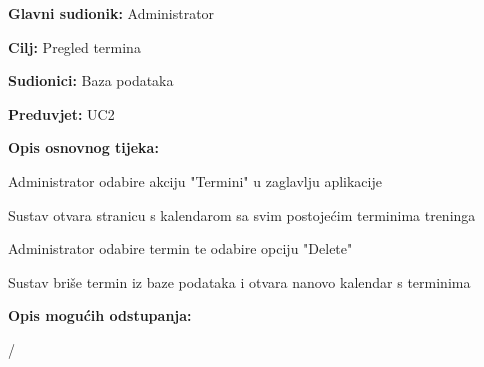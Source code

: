 		   			
		   			\begin{packed_item}
		   				
		   				\item \textbf{Glavni sudionik: }Administrator
		   				\item  \textbf{Cilj:} Pregled termina
		   				\item  \textbf{Sudionici:} Baza podataka
		   				\item  \textbf{Preduvjet:} UC2
		   				\item  \textbf{Opis osnovnog tijeka:}
		   				
		   				\item[] \begin{packed_enum}
		   					
		   					\item Administrator odabire akciju "Termini" u zaglavlju aplikacije
		   					\item Sustav otvara stranicu s kalendarom sa svim postojećim terminima treninga
		   					\item Administrator odabire termin te odabire opciju "Delete"
		   					\item Sustav briše termin iz baze podataka i otvara nanovo kalendar s terminima
		   					
		   				\end{packed_enum}
		   				
		   				\item  \textbf{Opis mogućih odstupanja:}
		   				
		   				\begin{packed_enum}
		   					
		   					\item /
		   					
		   				\end{packed_enum}
		   				
		   			\end{packed_item}
	   			
	   			
	   				\noindent {}
	   				
